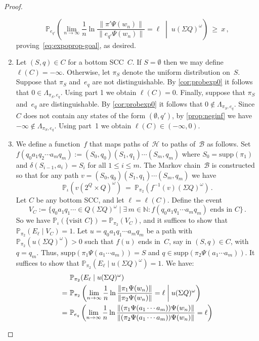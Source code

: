 \documentclass[a4paper,UKenglish,cleveref, autoref,mathscr]{lipics-v2019}
\newcommand{\NN}{\mathbb{N}}
\newcommand{\PP}{\mathbb{P}}
\newcommand{\1}{\mathbbm{1}}
\newcommand{\supp}{\mathrm{supp}}
\newcommand{\B}{\mathcal{B}}
\renewcommand{\H}{\mathcal{H}}
\begin{document}
\begin{proof}
\begin{enumerate}
\[ \PP_{e_{q'}}\left(\lim_{n \to \infty} \frac1n \ln \frac{\| \pi' \Psi(w_n) \|}{\| e_{q'} \Psi(w_n) \|} = \ell \;\middle\vert\; u (\Sigma Q)^\omega \right) \ \ge\ x\,,
\]
proving~\eqref{eq:expoprop-goal}, as desired.
\item
Let $(S,q) \in C$ for a bottom SCC~$C$.
If $S = \emptyset$ then we may define $\ell(C) = -\infty$.
Otherwise, let $\pi_S$ denote the uniform distribution on~$S$.
Suppose that $\pi_S$ and~$e_q$ are not distinguishable.
By \cref{cor:probexp0} it follows that $0 \in \Lambda_{\pi_S,e_q}$.
Using part 1 we obtain $\ell(C) = 0$.
Finally, suppose that $\pi_S$ and~$e_q$ are distinguishable.
By \cref{cor:probexp0} it follows that $0 \not\in \Lambda_{\pi_S,e_q}$.
Since $C$ does not contain any states of the form $(\emptyset,q')$, by \cref{prop:neginf} we have $-\infty \not\in \Lambda_{\pi_S,e_q}$.
Using part~1 we obtain $\ell(C) \in (-\infty,0)$.
\item
We define a function~$f$ that maps paths of~$\H$ to paths of~$\B$ as follows.
Set $f(q_0 a_1 q_2 \cdots a_m q_m) := (S_0,q_0) (S_1,q_1) \cdots (S_m,q_m)$ where $S_0 = \supp(\pi_1)$ and $\delta(S_{i-1},a_i) = S_i$ for all $1 \le i \le m$.
The Markov chain~$\B$ is constructed so that for any path $v = (S_0,q_0) (S_1,q_1) \cdots (S_m,q_m)$ we have
\[
 \PP_\iota( v (2^Q \times Q)^\omega) \ = \ \PP_{\pi_2}(f^{-1}(v)(\Sigma Q)^\omega)\,.
\]
Let $C$ be any bottom SCC, and let $\ell = \ell(C)$.
Define the event
\[
 V_C := \{q_0 a_1 q_1 \cdots \in Q(\Sigma Q)^\omega \mid \exists\,m \in \NN : f(q_0 a_1 q_1 \cdots a_m q_m) \text{ ends in~$C$} \}\,.
\]
So we have $\PP_{\iota}(\{\text{visit $C$}\}) = \PP_{\pi_2}(V_C)$, and it suffices to show that $\PP_{\pi_2}(E_\ell \mid V_C) = 1$.
Let $u = q_0 a_1 q_1 \cdots a_m q_m$ be a path with $\PP_{\pi_2}(u (\Sigma Q)^\omega) > 0$ such that $f(u)$ ends in~$C$, say in $(S,q) \in C$, with $q = q_m$.
Thus, $\supp(\pi_1 \Psi(a_1 \cdots a_m)) = S$ and $q \in \supp(\pi_2 \Psi(a_1 \cdots a_m))$.
It suffices to show that $\PP_{\pi_2}(E_\ell \mid u (\Sigma Q)^\omega) = 1$.
We have:
\begin{align}
    & \PP_{\pi_2}(E_\ell \mid u (\Sigma Q)^\omega) \notag \\
 =\ & \PP_{\pi_2}\left(\lim_{n \to \infty} \frac1n \ln \frac{\| \pi_1 \Psi(w_n) \|}{\| \pi_2 \Psi(w_n) \|} = \ell \;\middle\vert\; u (\Sigma Q)^\omega \right) \notag \\
 =\ & \PP_{e_q}\left( \lim_{n \to \infty} \frac1n \ln \frac{\| (\pi_1 \Psi(a_1 \cdots a_m)) \Psi(w_n) \|}{ \| (\pi_2 \Psi(a_1 \cdots a_m)) \Psi(w_n) \|} = \ell \right) \notag \\

\end{align}
\end{enumerate}
\end{proof}
\end{document}

